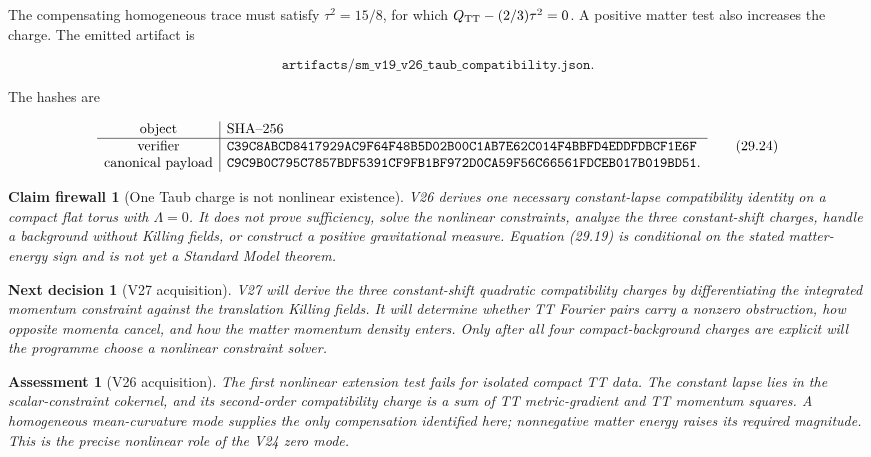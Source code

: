 \documentclass[11pt]{article}
\newtheorem{firewall}[theorem]{Claim firewall}
\newtheorem{decision}[theorem]{Next decision}
\newtheorem{assessment}[theorem]{Assessment}
\theoremstyle{remark}
\begin{document}
The compensating homogeneous trace must satisfy
\(\tau^2=15/8\), for which
\(Q_{\rm TT}-(2/3)\tau^2=0\).  A positive matter test also increases the
charge.  The emitted artifact is

\[
 \texttt{artifacts/sm\_v19\_v26\_taub\_compatibility.json}.    \tag{29.23}
\]

The hashes are

\[
\begin{array}{c|l}
\hbox{object}&\hbox{SHA--256}\\ \hline
\hbox{verifier}&
\texttt{C39C8ABCD8417929AC9F64F48B5D02B00C1AB7E62C014F4BBFD4EDDFDBCF1E6F}\\
\hbox{canonical payload}&
\texttt{C9C9B0C795C7857BDF5391CF9FB1BF972D0CA59F56C66561FDCEB017B019BD51}.
\end{array}                                                     \tag{29.24}
\]

\begin{firewall}[One Taub charge is not nonlinear existence]
\label{fire:v19v26}
V26 derives one necessary constant-lapse compatibility identity on a
compact flat torus with \(\Lambda=0\).  It does not prove sufficiency,
solve the nonlinear constraints, analyze the three constant-shift
charges, handle a background without Killing fields, or construct a
positive gravitational measure.  Equation (29.19) is conditional on the
stated matter-energy sign and is not yet a Standard Model theorem.
\end{firewall}

\begin{decision}[V27 acquisition]
\label{dec:v19v26-next}
V27 will derive the three constant-shift quadratic compatibility charges
by differentiating the integrated momentum constraint against the
translation Killing fields.  It will determine whether TT Fourier pairs
carry a nonzero obstruction, how opposite momenta cancel, and how the
matter momentum density enters.  Only after all four compact-background
charges are explicit will the programme choose a nonlinear constraint
solver.
\end{decision}

\begin{assessment}[V26 acquisition]
\label{ass:v19v26}
The first nonlinear extension test fails for isolated compact TT data.
The constant lapse lies in the scalar-constraint cokernel, and its
second-order compatibility charge is a sum of TT metric-gradient and
TT momentum squares.  A homogeneous mean-curvature mode supplies the
only compensation identified here; nonnegative matter energy raises its
required magnitude.  This is the precise nonlinear role of the V24 zero
mode.
\end{assessment}
\end{document}
